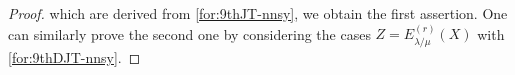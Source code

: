 \documentclass[10pt,a4paper]{amsart}
\begin{document}
\begin{proof}
which are derived from \eqref{for:9thJT-nnsy},
we obtain the first assertion.
One can similarly prove the second one by considering the cases $Z=E^{(r)}_{\lambda/\mu}(X)
$ with \eqref{for:9thDJT-nnsy}.
\end{proof}
\end{document}
